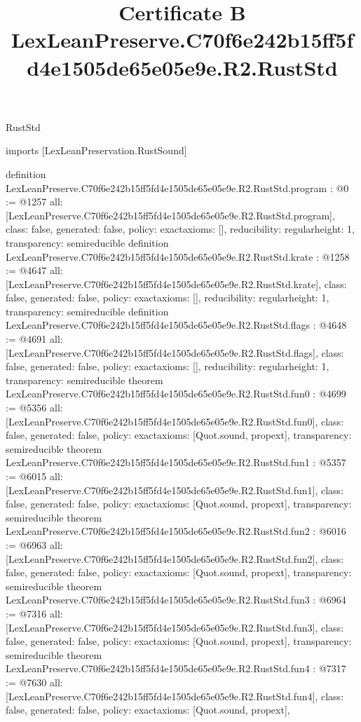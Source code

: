 \begin{lexlean}{RustStd}
\title{Certificate B LexLeanPreserve.C70f6e242b15ff5fd4e1505de65e05e9e.R2.RustStd}
\begin{coremodule}
imports [LexLeanPreservation.RustSound]

definition LexLeanPreserve.C70f6e242b15ff5fd4e1505de65e05e9e.R2.RustStd.program : @0 := @1257 {
  all: [LexLeanPreserve.C70f6e242b15ff5fd4e1505de65e05e9e.R2.RustStd.program],
  class: false,
  generated: false,
  policy: exact{axioms: []},
  reducibility: regular{height: 1},
  transparency: semireducible
}
definition LexLeanPreserve.C70f6e242b15ff5fd4e1505de65e05e9e.R2.RustStd.krate : @1258 := @4647 {
  all: [LexLeanPreserve.C70f6e242b15ff5fd4e1505de65e05e9e.R2.RustStd.krate],
  class: false,
  generated: false,
  policy: exact{axioms: []},
  reducibility: regular{height: 1},
  transparency: semireducible
}
definition LexLeanPreserve.C70f6e242b15ff5fd4e1505de65e05e9e.R2.RustStd.flags : @4648 := @4691 {
  all: [LexLeanPreserve.C70f6e242b15ff5fd4e1505de65e05e9e.R2.RustStd.flags],
  class: false,
  generated: false,
  policy: exact{axioms: []},
  reducibility: regular{height: 1},
  transparency: semireducible
}
theorem LexLeanPreserve.C70f6e242b15ff5fd4e1505de65e05e9e.R2.RustStd.fun0 : @4699 := @5356 {
  all: [LexLeanPreserve.C70f6e242b15ff5fd4e1505de65e05e9e.R2.RustStd.fun0],
  class: false,
  generated: false,
  policy: exact{axioms: [Quot.sound, propext]},
  transparency: semireducible
}
theorem LexLeanPreserve.C70f6e242b15ff5fd4e1505de65e05e9e.R2.RustStd.fun1 : @5357 := @6015 {
  all: [LexLeanPreserve.C70f6e242b15ff5fd4e1505de65e05e9e.R2.RustStd.fun1],
  class: false,
  generated: false,
  policy: exact{axioms: [Quot.sound, propext]},
  transparency: semireducible
}
theorem LexLeanPreserve.C70f6e242b15ff5fd4e1505de65e05e9e.R2.RustStd.fun2 : @6016 := @6963 {
  all: [LexLeanPreserve.C70f6e242b15ff5fd4e1505de65e05e9e.R2.RustStd.fun2],
  class: false,
  generated: false,
  policy: exact{axioms: [Quot.sound, propext]},
  transparency: semireducible
}
theorem LexLeanPreserve.C70f6e242b15ff5fd4e1505de65e05e9e.R2.RustStd.fun3 : @6964 := @7316 {
  all: [LexLeanPreserve.C70f6e242b15ff5fd4e1505de65e05e9e.R2.RustStd.fun3],
  class: false,
  generated: false,
  policy: exact{axioms: [Quot.sound, propext]},
  transparency: semireducible
}
theorem LexLeanPreserve.C70f6e242b15ff5fd4e1505de65e05e9e.R2.RustStd.fun4 : @7317 := @7630 {
  all: [LexLeanPreserve.C70f6e242b15ff5fd4e1505de65e05e9e.R2.RustStd.fun4],
  class: false,
  generated: false,
  policy: exact{axioms: [Quot.sound, propext]},
}
\end{coremodule}
\end{lexlean}
